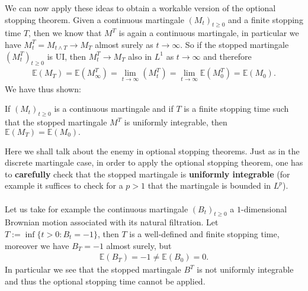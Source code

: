 \documentclass[../mainfile.tex]{subfiles}
\begin{document}
We can now apply these ideas to obtain a workable version of the optional stopping theorem. Given a continuous martingale $(M_t)_{t \geq 0}$ and a finite stopping time $T$, then we know that $M^T$ is again a continuous martingale, in particular we have $M_t^T = M_{t \wedge T} \to M_T$ almost surely as $t \to \infty$. So if the stopped martingale $(M_t^T)_{t \geq 0}$ is UI, then $M_t^T \to M_T$ also in $L^1$ as $t \to \infty$ and therefore
\begin{align*}
\mathbb{E}(M_T)= \mathbb{E}(M_\infty^T) = \lim_{t \to \infty} (M_t^T)= \lim_{t \to \infty} \mathbb{E}(M_0^T)= \mathbb{E}(M_0). 
\end{align*} 
We have thus shown:
\begin{thm} If $(M_t)_{t \geq 0}$ is a continuous martingale and if $T$ is a finite stopping time such that the stopped martingale $M^T$ is uniformly integrable, then $\mathbb{E}(M_T)= \mathbb{E}(M_0).$ 
\end{thm}
\newpage
\begin{exmp} Here we shall talk about the enemy in optional stopping theorems. Just as in the discrete martingale case, in order to apply the optional stopping theorem, one has to \textbf{carefully} check that the stopped martingale is \textbf{uniformly integrable} (for example it suffices to check for a $p>1$ that the martingale is bounded in $L^p$).
\\\\
Let us take for example the continuous martingale $(B_t)_{t \geq 0}$ a $1$-dimensional Brownian motion associated with its natural filtration. Let $T:= \inf \{ t >0 : B_t = -1 \}$, then $T$ is a well-defined and finite stopping time, moreover we have $B_T=-1$ almost surely, but 
\begin{align*}
\mathbb{E}(B_T)=-1 \neq \mathbb{E}(B_0)=0.
\end{align*}
In particular we see that the stopped martingale $B^T$ is not uniformly integrable and thus the optional stopping time cannot be applied. 
\end{exmp}
\end{document}
